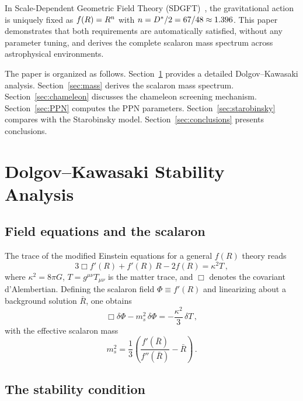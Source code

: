 \documentclass[amsmath,amssymb,aps,prd,twocolumn,superscriptaddress,nofootinbib]{revtex4-2}
\begin{document}
In Scale-Dependent Geometric Field Theory
(SDGFT)~\cite{Besemer_Paper01,Besemer_Paper04}, the gravitational
action is uniquely fixed as $f(R) = R^{n}$ with
$n = D^{*}/2 = 67/48 \approx 1.396$.  This paper demonstrates
that both requirements are automatically satisfied, without any
parameter tuning, and derives the complete scalaron mass spectrum
across astrophysical environments.

The paper is organized as follows.
Section~\ref{sec:DK} provides a detailed Dolgov--Kawasaki analysis.
Section~\ref{sec:mass} derives the scalaron mass spectrum.
Section~\ref{sec:chameleon} discusses the chameleon screening
mechanism.  Section~\ref{sec:PPN} computes the PPN parameters.
Section~\ref{sec:starobinsky} compares with the Starobinsky model.
Section~\ref{sec:conclusions} presents conclusions.

\section{Dolgov--Kawasaki Stability Analysis}
\label{sec:DK}

\subsection{Field equations and the scalaron}

The trace of the modified Einstein equations for a general $f(R)$
theory reads~\cite{Sotiriou2010}
\begin{equation}
  3\Box f'(R) + f'(R)\,R - 2f(R) = \kappa^2 T\,,
  \label{eq:trace}
\end{equation}
where $\kappa^2 = 8\pi G$, $T = g^{\mu\nu}T_{\mu\nu}$ is the
matter trace, and $\Box$ denotes the covariant d'Alembertian.
Defining the scalaron field $\Phi \equiv f'(R)$ and linearizing
about a background solution $\bar{R}$, one obtains
\begin{equation}
  \Box\delta\Phi - m_s^2\,\delta\Phi = -\frac{\kappa^2}{3}\,\delta T\,,
  \label{eq:scalaron_eom}
\end{equation}
with the effective scalaron mass
\begin{equation}
  m_s^2 = \frac{1}{3}\left(\frac{f'(\bar{R})}{f''(\bar{R})}
        - \bar{R}\right)\,.
  \label{eq:ms_def}
\end{equation}

\subsection{The stability condition}
\end{document}
